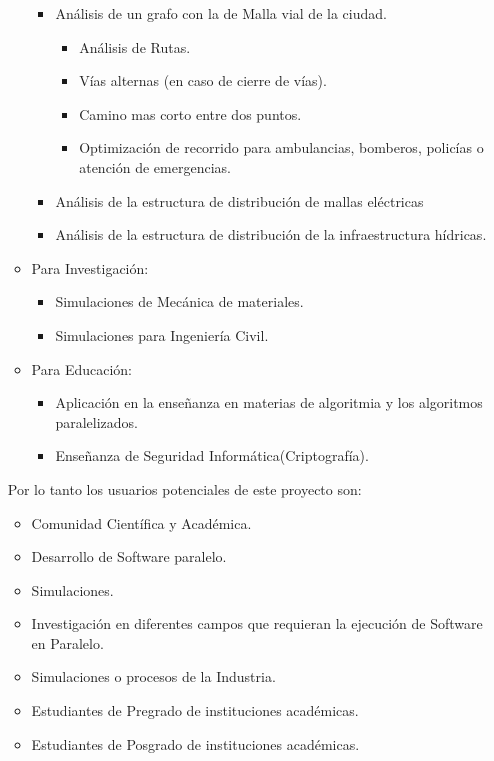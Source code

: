 \begin{itemize}
\begin{itemize}
		\begin{itemize}
			\item Análisis de un grafo con la de Malla vial de la ciudad.
				\begin{itemize}
				 	\item Análisis de Rutas.
				 	\item Vías alternas (en caso de cierre de vías).
				 	\item Camino mas corto entre dos puntos. 
				 	\item Optimización de recorrido para ambulancias, bomberos, policías o atención de emergencias. 
				 \end{itemize} 

			\item Análisis de la estructura de distribución de mallas eléctricas 
			\item Análisis de la estructura de distribución de la infraestructura hídricas.

		\end{itemize}

		\item Para Investigación: 

		\begin{itemize}
			\item Simulaciones de Mecánica de materiales.
			\item Simulaciones para Ingeniería Civil.		
		\end{itemize}

		\item Para Educación: 
			\begin{itemize}
				\item Aplicación en la enseñanza en materias de algoritmia y los algoritmos paralelizados.
				\item Enseñanza de Seguridad Informática(Criptografía).
			\end{itemize}

	\end{itemize}

	Por lo tanto los usuarios potenciales de este proyecto son: 

		\begin{itemize}
			\item Comunidad Científica y Académica.
			\item Desarrollo de Software paralelo. 
			\item Simulaciones.
			\item Investigación en diferentes campos que requieran la ejecución de Software en Paralelo. 
			\item Simulaciones o procesos de la Industria.
			\item Estudiantes de Pregrado de instituciones académicas.
			\item Estudiantes de Posgrado de instituciones académicas.
		\end{itemize}

\end{itemize}

